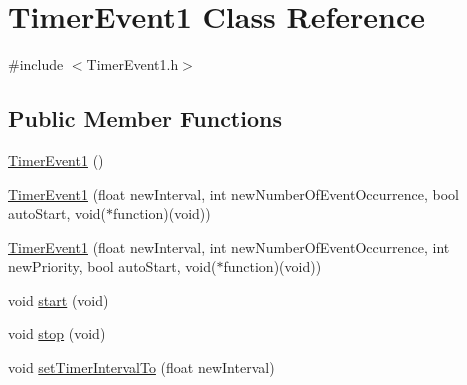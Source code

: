 \hypertarget{class_timer_event1}{
\section{TimerEvent1 Class Reference}
\label{d8/d74/class_timer_event1}
}


{\ttfamily \#include $<$TimerEvent1.h$>$}

\subsection*{Public Member Functions}
\begin{DoxyCompactItemize}
\item 
\hyperlink{class_timer_event1_a4a3f27d691e0ae3f9367f1d26d0085c7}{TimerEvent1} ()
\item 
\hyperlink{class_timer_event1_aa7938b8d73d92e4396462424c9d34070}{TimerEvent1} (float newInterval, int newNumberOfEventOccurrence, bool autoStart, void($\ast$function)(void))
\item 
\hyperlink{class_timer_event1_adfe467329a573f4327dbe958f00cb725}{TimerEvent1} (float newInterval, int newNumberOfEventOccurrence, int newPriority, bool autoStart, void($\ast$function)(void))
\item 
void \hyperlink{class_timer_event1_abe79255ea3853f0dc834a9590020f78b}{start} (void)
\item 
void \hyperlink{class_timer_event1_aed7772681d46c2cf3599d87ba4b3bac2}{stop} (void)
\item 
void \hyperlink{class_timer_event1_ae0feef0a092431705c50365f102370ff}{setTimerIntervalTo} (float newInterval)
\end{DoxyCompactItemize}


